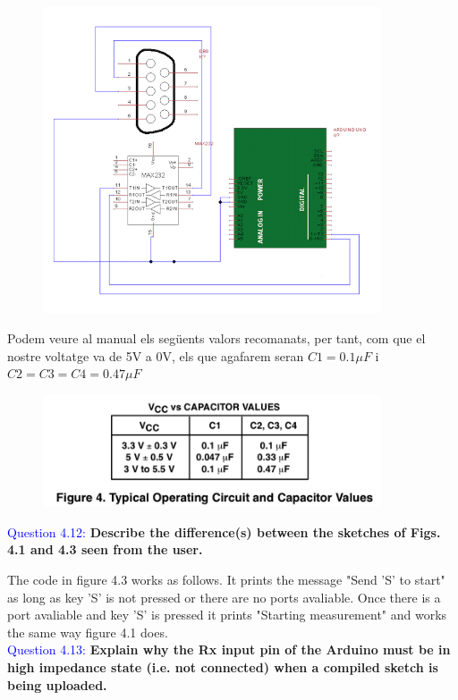 \documentclass[12pt, a4papre]{article}
\begin{document}
	\begin{figure}[H]
		\begin{center}
		\includegraphics[width=100mm]{tinycadWP4.png}
		\end{center}
	\end{figure}
	
	Podem veure al manual els següents valors recomanats, per tant, com que el nostre voltatge va de 5V a 0V, els que agafarem seran $C1 = 0.1\mu F$ i $C2 = C3= C4 = 0.47\mu F$
	
	\begin{figure}[H]
		\begin{center}
		\includegraphics[width=100mm]{CapMan.png}
		\end{center}
	\end{figure}

	\textcolor{blue}{Question 4.12:} \textbf{Describe the difference(s) between the sketches of Figs. 4.1 and 4.3 seen from the user.}
	
	The code in figure 4.3 works as follows. It prints the message "Send 'S' to start" as long as key 'S' is not pressed or there are no ports avaliable. Once there is a port avaliable and key 'S' is pressed it prints "Starting measurement" and works the same way figure 4.1 does.\\
	
	\textcolor{blue}{Question 4.13:} \textbf{Explain why the Rx input pin of the Arduino must be in high impedance state (i.e. not connected) when a compiled sketch is being uploaded. }
	
\end{document}
